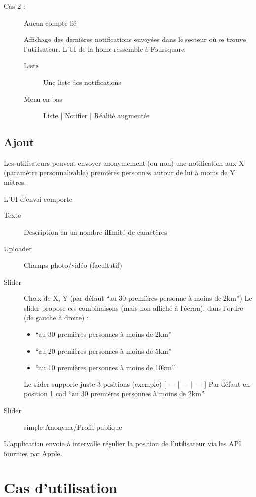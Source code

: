 \documentclass[a4paper,12pt]{report}
\begin{document}
\begin{onehalfspace}
\begin{description}
		\item[Cas 2 :] Aucun compte lié

		Affichage des dernières notifications envoyées dans le secteur où se trouve l’utilisateur.
		L’UI de la home ressemble à Foursquare:
			\begin{description}
			\item[Liste] Une liste des notifications
			\item[Menu en bas] Liste | Notifier | Réalité augmentée
			\end{description}
	\end{description}


	\section*{Ajout}
	Les utilisateurs peuvent envoyer anonymement (ou non) une notification aux X (paramètre personnalisable) premières personnes autour de lui à moins de Y mètres.

	L’UI d’envoi comporte:
		\begin{description}
		\item[Texte] Description en un nombre illimité de caractères
		\item[Uploader] Champs photo/vidéo (facultatif)
		\item[Slider] Choix de X, Y (par défaut “au 30 premières personne à moins de 2km”)
		Le slider propose ces combinaisons (mais non affiché à l’écran), dans l’ordre (de gauche à droite) :
			\begin{itemize}
			\item “au 30 premières personnes à moins de 2km”
			\item “au 20 premières personnes à moins de 5km”
			\item “au 10 premières personnes à moins de 10km”
			\end{itemize}
		Le slider supporte juste 3 positions (exemple) [ --- | --- | --- ]
		Par défaut en position 1 cad “au 30 premières personnes à moins de 2km”
		\item[Slider] simple Anonyme/Profil publique
		\end{description}

	L’application envoie à intervalle régulier la position de l’utilisateur via les API fournies par Apple.

	\chapter*{Cas d’utilisation}


\end{onehalfspace}
\end{document}
